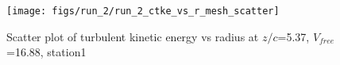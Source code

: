 \begin{figure}[H]
\centering
\texttt{[image: figs/run\_2/run\_2\_ctke\_vs\_r\_mesh\_scatter]}
\caption{Scatter plot of turbulent kinetic energy vs radius at $z/c$=5.37, $V_{free}$=16.88, station1}
\label{fig:run_2_ctke_vs_r_mesh_scatter}
\end{figure}


